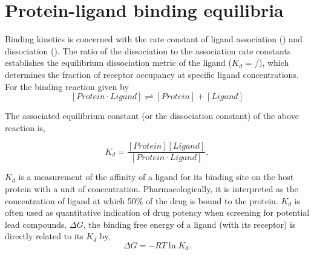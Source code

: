 \section{Protein-ligand binding equilibria}

Binding kinetics is concerned with the rate constant of ligand association (\kon) and dissociation (\koff). The ratio of the dissociation to the association rate constants establishes the equilibrium dissociation metric of the ligand ($K_{d}$ = \koff/\kon), which determines the fraction of receptor occupancy at specific ligand concentrations. For the binding reaction given by
\begin{equation}
\left[ Protein\cdot Ligand \right] \rightleftharpoons \left[ Protein \right]+\left[ Ligand \right]
\end{equation}
 
The associated equilibrium constant (or the dissociation constant) of the above reaction is,

 \begin{equation}
  K_{d} = \frac{\left[ Protein \right]\left[ Ligand \right]}{\left[Protein \cdot Ligand\right]},
 \end{equation}

$K_d$ is a measurement of the affinity of a ligand for its binding site on the host protein with a unit of concentration. Pharmacologically, it is interpreted as the concentration of ligand at which 50\% of the drug is bound to the protein. $K_d$ is often used as quantitative indication of drug potency when screening for potential lead compounds. $\Delta G$, the binding free energy of a ligand (with its receptor) is directly related to its $K_{d}$ by,
\begin{equation}
	\Delta G = -RT\ln K_{d}.
\end{equation}


